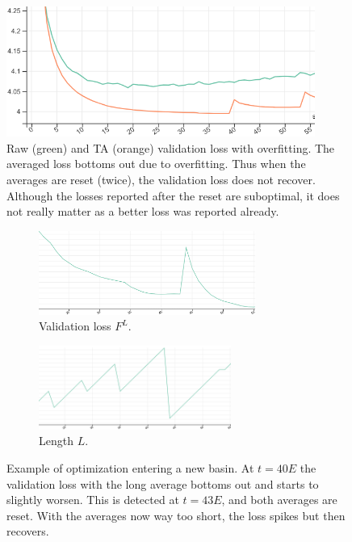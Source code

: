\documentclass[twocolumn]{article}
\newcommand{\tta}{\liningnums{2}TA}
\begin{document}
\begin{figure}[t]
  \centering
  \includegraphics[width=0.9\textwidth]{figure/overfitting.png}
  \caption[Raw and \tta{} validation loss with overfitting.]{Raw (green) and \tta{} (orange) validation loss with overfitting.
The averaged loss bottoms out due to overfitting.
Thus when the averages are reset (twice), the validation loss does not recover.
Although the losses reported after the reset are suboptimal, it does not really matter as a better loss was reported already.}
  \label{fig:overfitting}
\end{figure}

\begin{figure}[t]
  \begin{subfigure}{0.52\textwidth}
    \includegraphics[width=\linewidth,height=2.75cm,clip]{figure/new-basin.png}
    \caption{Validation loss $F^L$.}
  \end{subfigure}
  \hfill
  \begin{subfigure}{0.45\textwidth}
    \includegraphics[width=\linewidth,height=2.75cm,clip]
                    {figure/new-basin-samples.png}
    \caption{Length $L$.}
  \end{subfigure}
  \caption[Example of optimization entering a new basin.]{Example of optimization entering a new basin.
At $t=40E$ the validation loss with the long average bottoms out and starts to slightly worsen.
This is detected at $t=43E$, and both averages are reset.
With the averages now way too short, the loss spikes but then recovers.}
  \label{fig:new-basin}
\end{figure}
\end{document}
